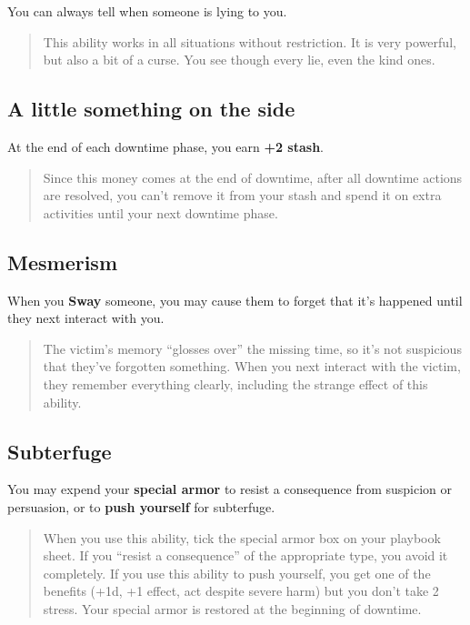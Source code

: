 \documentclass[11pt,oneside]{book}
\newcommand{\gameterm}[1]{\textbf{#1}}
\begin{document}
You can always tell when someone is lying to you.

\begin{quote}
	This ability works in all situations without restriction. It is very powerful, but also a bit of a curse. You see though every lie, even the kind ones.
\end{quote} 

\subsection{A little something on the side}

At the end of each downtime phase, you earn \textbf{+2 stash}.

\begin{quote}
	Since this money comes at the end of downtime, after all downtime actions are resolved, you can’t remove it from your stash and spend it on extra activities until your next downtime phase.
\end{quote} 

\subsection{Mesmerism}

When you \gameterm{Sway}  someone, you may cause them to forget that it’s happened until they next interact with you.

\begin{quote}
	The victim’s memory “glosses over” the missing time, so it’s not suspicious that they’ve forgotten something. When you next interact with the victim, they remember everything clearly, including the strange effect of this ability.
\end{quote} 

\subsection{Subterfuge}

You may expend your \textbf{special armor} to resist a consequence from suspicion or persuasion, or to \textbf{push yourself} for subterfuge.

\begin{quote}
	When you use this ability, tick the special armor box on your playbook sheet. If you “resist a consequence” of the appropriate type, you avoid it completely. If you use this ability to push yourself, you get one of the benefits (+1d, +1 effect, act despite severe harm) but you don’t take 2 stress. Your special armor is restored at the beginning of downtime.
\end{quote} 
\end{document}
